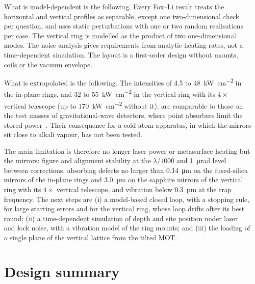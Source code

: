 \documentclass[11pt]{article}
\begin{document}
What is model-dependent is the following. Every Fox--Li result treats the horizontal and vertical
profiles as separable, except one two-dimensional check per question, and uses static perturbations
with one or two random realisations per case. The vertical ring is modelled as the product of two
one-dimensional modes. The noise analysis gives requirements from analytic heating rates, not a
time-dependent simulation. The layout is a first-order design without mounts, coils or the vacuum
envelope.

What is extrapolated is the following. The intensities of 4.5 to \SI{48}{\kilo\watt\per\centi\metre\squared}
in the in-plane rings, and 32 to \SI{55}{\kilo\watt\per\centi\metre\squared} in the vertical ring with its
$4\times$ vertical telescope (up to \SI{170}{\kilo\watt\per\centi\metre\squared} without it), are comparable to those
on the test masses of gravitational-wave detectors, where point absorbers limit the stored
power~\cite{Brooks2021}. Their consequence for a cold-atom apparatus, in which the mirrors sit close to
alkali vapour, has not been tested.

The main limitation is therefore no longer laser power or metasurface heating but the mirrors: figure
and alignment stability at the $\lambda/1000$ and \SI{1}{\micro\radian} level between corrections,
absorbing defects no larger than \SI{0.14}{\micro\metre} on the fused-silica mirrors of the in-plane
rings and \SI{3.0}{\micro\metre} on the sapphire mirrors of the vertical ring with its $4\times$
vertical telescope, and vibration below \SI{0.3}{\pico\metre}\rtHz{} at the trap frequency. The next steps
are (i) a model-based closed loop, with a stopping rule, for large starting errors and for the vertical
ring, whose loop drifts after its best round; (ii) a time-dependent simulation of depth and site position under laser
and lock noise, with a vibration model of the ring mounts; and (iii) the loading of a single plane of the vertical lattice from the
tilted MOT.




\appendix

\section{Design summary}
\label{app:summary}
\end{document}
